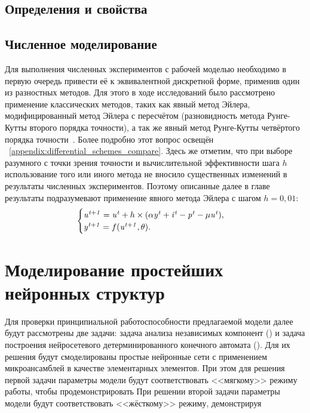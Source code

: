 \subsection{Определения и свойства}

\subsection{Численное моделирование}

Для выполнения численных экспериментов с рабочей моделью необходимо в первую очередь привести её к эквивалентной дискретной форме, применив один из разностных методов. Для этого в ходе исследований было рассмотрено применение классических методов, таких как явный метод Эйлера, модифицированный метод Эйлера с пересчётом (разновидность метода Рунге-Кутты второго порядка точности), а так же явный метод Рунге-Кутты четвёртого порядка точности~\cite{Hairer1990}. Более подробно этот вопрос освещён \inappendix~\ref{appendix:differential_schemes_compare}. Здесь же отметим, что при выборе разумного с точки зрения точности и вычислительной эффективности шага $h$ использование того или иного метода не вносило существенных изменений в результаты численных экспериментов. Поэтому описанные далее в главе результаты подразумевают применение явного метода Эйлера с шагом $h = 0,01$:
\begin{equation*}
    \begin{cases}
        \mathit{u^{t+1}} = \mathit{u^{t}} + h \times ( \alpha\mathit{y^{t}} + \mathit{i^{t}} - \mathit{p^{t}} - \mu\mathit{u^{t}} ), \\ 
        \mathit{y^{t+1}} = f(\mathit{u^{t+1}}, \theta).
    \end{cases}
\end{equation*}


\section{Моделирование простейших нейронных структур} \label{section:neuron_modeling}

Для проверки принципиальной работоспособности предлагаемой модели далее будут рассмотрены две задачи: задача анализа независимых компонент () и задача построения нейросетевого детерминированного конечного автомата (). Для их решения будут смоделированы простые нейронные сети с применением микроансамблей в качестве элементарных элементов. При этом для решения первой задачи параметры модели будут соответствовать <<мягкому>> режиму работы, чтобы продемонстрировать  При решении второй задачи параметры модели будут соответствовать <<жёсткому>> режиму, демонстрируя

